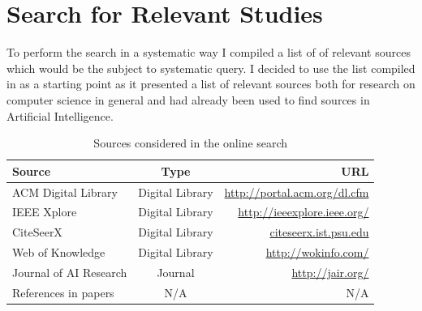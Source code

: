 \documentclass[a4paper]{book}
\begin{document}
\section{Search for Relevant Studies}

To perform the search in a systematic way I compiled a list of of relevant sources which would be the subject to systematic query. I decided to use the list compiled in \cite{Lillegraven_design_2010} as a starting point as it presented a list of relevant sources both for research on computer science in general and had already been used to find sources in Artificial Intelligence. 


\begin{table}[htdp]
\begin{center}
\begin{tabular}{|l|c|r|}\hline
Source                  &   Type                        & URL \\ \hline \hline
ACM Digital Library     &   Digital Library             & \url{http://portal.acm.org/dl.cfm} \\  \hline %
IEEE Xplore             &   Digital Library             & \url{http://ieeexplore.ieee.org/} \\ \hline   %
CiteSeerX               &   Digital Library             & \url{citeseerx.ist.psu.edu} \\ \hline         %
Web of Knowledge        &   Digital Library             & \url{http://wokinfo.com/} \\ \hline           %
Journal of AI Research   &   Journal                     & \url{http://jair.org/} \\  \hline      %
References in papers    &   N/A                         & N/A \\\hline\hline
\end{tabular}
\end{center}
\label{table:sources}
\caption{Sources considered in the online search}
\end{table}
\end{document}
